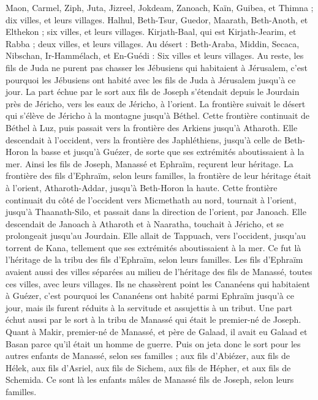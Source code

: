 \begin{multicols}{2}
Maon, Carmel, Ziph, Juta,
Jizreel, Jokdeam, Zanoach,
Kaïn, Guibea, et Thimna ; dix villes, et leurs villages.
Halhul, Beth-Tsur, Guedor,
Maarath, Beth-Anoth, et Elthekon ; six villes, et leurs villages.
Kirjath-Baal, qui est Kirjath-Jearim, et Rabba ; deux villes, et leurs villages.
Au désert : Beth-Araba, Middin, Secaca,
Nibschan, Ir-Hammélach, et En-Guédi : Six villes et leurs villages.
Au reste, les fils de Juda ne purent pas chasser les Jébusiens qui habitaient à Jérusalem, c’est pourquoi les Jébusiens ont habité avec les fils de Juda à Jérusalem jusqu’à ce jour.
\VerseOne{}La part échue par le sort aux fils de Joseph s’étendait depuis le Jourdain près de Jéricho, vers les eaux de Jéricho, à l’orient. La frontière suivait le désert qui s’élève de Jéricho à la montagne jusqu’à Béthel.
Cette frontière continuait de Béthel à Luz, puis passait vers la frontière des Arkiens jusqu’à Atharoth.
Elle descendait à l’occident, vers la frontière des Japhléthiens, jusqu’à celle de Beth-Horon la basse et jusqu’à Guézer, de sorte que ses extrémités aboutissaient à la mer.
Ainsi les fils de Joseph, Manassé et Ephraïm, reçurent leur héritage.
La frontière des fils d’Ephraïm, selon leurs familles, la frontière de leur héritage était à l’orient, Atharoth-Addar, jusqu’à Beth-Horon la haute.
Cette frontière continuait du côté de l’occident vers Micmethath au nord, tournait à l’orient, jusqu’à Thaanath-Silo, et passait dans la direction de l’orient, par Janoach.
Elle descendait de Janoach à Atharoth et à Naaratha, touchait à Jéricho, et se prolongeait jusqu’au Jourdain.
Elle allait de Tappuach, vers l’occident, jusqu’au torrent de Kana, tellement que ses extrémités aboutissaient à la mer. Ce fut là l’héritage de la tribu des fils d’Ephraïm, selon leurs familles.
Les fils d’Ephraïm avaient aussi des villes séparées au milieu de l’héritage des fils de Manassé, toutes ces villes, avec leurs villages.
Ils ne chassèrent point les Cananéens qui habitaient à Guézer, c’est pourquoi les Cananéens ont habité parmi Ephraïm jusqu’à ce jour, mais ils furent réduits à la servitude et assujettis à un tribut.
\VerseOne{}Une part échut aussi par le sort à la tribu de Manassé qui était le premier-né de Joseph. Quant à Makir, premier-né de Manassé, et père de Galaad, il avait eu Galaad et Basan parce qu’il était un homme de guerre.
Puis on jeta donc le sort pour les autres enfants de Manassé, selon ses familles ; aux fils d’Abiézer, aux fils de Hélek, aux fils d’Asriel, aux fils de Sichem, aux fils de Hépher, et aux fils de Schemida. Ce sont là les enfants mâles de Manassé fils de Joseph, selon leurs familles.

\end{multicols}
